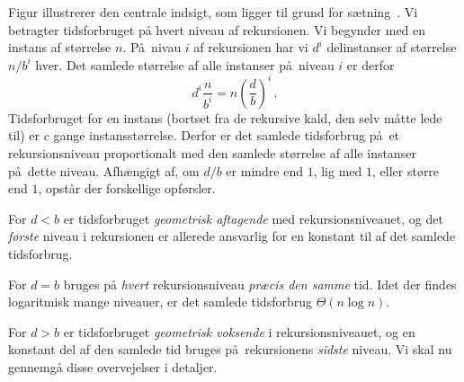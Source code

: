 %
Figur  illustrerer den centrale indsigt, som ligger til grund for sætning~.
Vi betragter tidsforbruget på hvert niveau af rekursionen.
Vi begynder med en instans af størrelse $n$.
På nivau $i$ af rekursionen har vi $d^i$ delinstanser af størrelse $n/b^i$ hver.
Det samlede størrelse af alle instanser på niveau $i$ er derfor
\[ d^i \frac{n}{b^i} = n \left( \frac{d}{b} \right)^i \,. \]
Tidsforbruget for en instans (bortset fra de rekursive kald, den selv måtte lede til) er $c$ gange instansstørrelse.
Derfor er det samlede tidsforbrug på et rekursionsniveau proportionalt med den samlede størrelse af alle instanser på dette niveau.
Afhængigt af, om $d/b$ er mindre end $1$, lig med $1$, eller større end $1$, opstår der forskellige opførsler.

For $d<b$ er tidsforbruget \emph{geometrisk aftagende}
med rekursionsniveauet, og det \emph{første} niveau i rekursionen er allerede ansvarlig for en konstant til af det samlede tidsforbrug.

For $d=b$ bruges på \emph{hvert} rekursionsniveau \emph{præcis den samme} tid.
Idet der findes logaritmisk mange niveauer, er det samlede tidsforbrug $\Theta(n\log n)$.

For $d>b$ er tidsforbruget \emph{geometrisk voksende} i rekursionsniveauet, og en konstant del af den samlede tid bruges på rekursionens \emph{sidste} niveau. 
Vi skal nu gennemgå disse overvejelser i detaljer.

